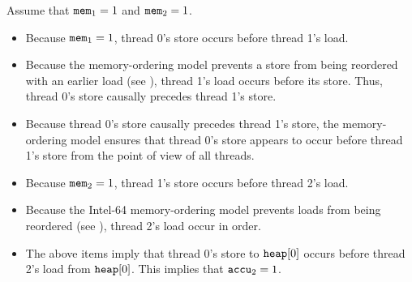 \begin{table}[!hbt]
\noindent{}
\caption{Stores Are Transitively Visible \cite[Example 8-6]{ref:Intel}}
\label{tbl:litmus:intel:6}
\end{table}

\noindent
Assume that $\texttt{mem}_1 = 1$ and $\texttt{mem}_2 = 1$.
\begin{itemize}
  \item Because $\texttt{mem}_1 = 1$, thread 0’s store occurs before thread 1’s load.
  \item Because the memory-ordering model prevents a store from being reordered with an earlier load (see \cite[Section 8.2.3.3]{ref:Intel}), thread 1’s load occurs before its store. Thus, thread 0’s store causally precedes thread 1’s store.
  \item Because thread 0’s store causally precedes thread 1’s store, the memory-ordering model ensures that thread 0’s store appears to occur before thread 1’s store from the point of view of all threads.
  \item Because $\texttt{mem}_2 = 1$, thread 1’s store occurs before thread 2’s load.
  \item Because the Intel-64 memory-ordering model prevents loads from being reordered (see \cite[Section 8.2.3.2]{ref:Intel}), thread 2’s load occur in order.
  \item The above items imply that thread 0’s store to $\texttt{heap}[0]$ occurs before thread 2’s load from $\texttt{heap}[0]$. This implies that $\texttt{accu}_2 = 1$.
\end{itemize}

